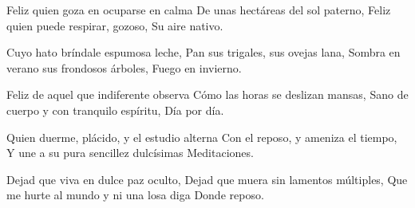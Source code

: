 \startlanguage[es]
\startlines
Feliz quien goza en ocuparse en calma
De unas hectáreas del sol paterno,
Feliz quien puede respirar, gozoso,
Su aire nativo.

Cuyo hato bríndale espumosa leche,
Pan sus trigales, sus ovejas lana,
Sombra en verano sus frondosos árboles,
Fuego en invierno.

Feliz de aquel que indiferente observa
Cómo las horas se deslizan mansas,
Sano de cuerpo y con tranquilo espíritu,
Día por día.

Quien duerme, plácido, y el estudio alterna
Con el reposo, y ameniza el tiempo,
Y une a su pura sencillez dulcísimas
Meditaciones.

Dejad que viva en dulce paz oculto,
Dejad que muera sin lamentos múltiples,
Que me hurte al mundo y ni una losa diga
Donde reposo.
\stoplines
\stoplanguage
